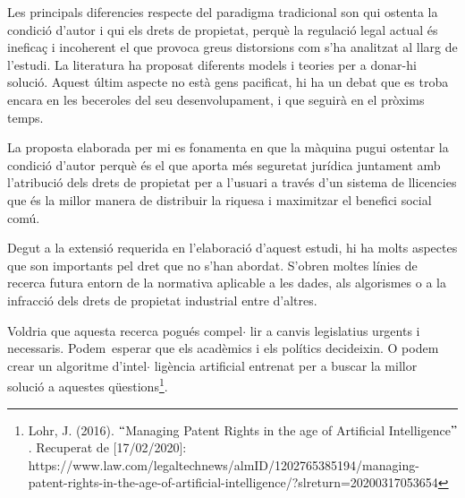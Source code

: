 \documentclass[12pt]{article}
\begin{document}
\vspace{\baselineskip}
\begin{justify}
Les principals diferencies respecte del paradigma tradicional son qui ostenta la condició d’autor i qui els drets de propietat,  perquè la regulació legal actual és ineficaç i incoherent el que provoca greus distorsions com s’ha analitzat al llarg de l’estudi. La literatura ha proposat diferents models i teories per a donar-hi solució. Aquest últim aspecte no està gens pacificat, hi ha un debat que es troba encara en les beceroles del seu desenvolupament, i que seguirà en el pròxims temps. 
\end{justify}\par


\vspace{\baselineskip}
\begin{justify}
La proposta elaborada per mi es fonamenta en que la màquina pugui ostentar la condició d’autor perquè és el que aporta més seguretat jurídica juntament amb l’atribució dels drets de propietat per a l’usuari a través d’un sistema de llicencies que és la millor manera de distribuir la riquesa i maximitzar el benefici social comú.
\end{justify}\par


\vspace{\baselineskip}
\begin{justify}
Degut a la extensió requerida en l’elaboració d’aquest estudi, hi ha molts aspectes que son importants pel dret que no s’han abordat. S’obren moltes línies de recerca futura entorn de la normativa aplicable a les dades, als algorismes o a la infracció dels drets de propietat industrial entre d’altres.
\end{justify}\par


\vspace{\baselineskip}
\begin{justify}
Voldria que aquesta recerca pogués compel$ \cdot $ lir a canvis legislatius urgents i necessaris. Podem\ esperar  que els acadèmics i els polítics decideixin. O podem crear un algoritme d’intel$ \cdot $ ligència artificial entrenat per a buscar la millor solució a aquestes qüestions\footnote{ Lohr, J. (2016). $``$Managing Patent Rights in the age of Artificial Intelligence$"$ . Recuperat de [17/02/2020]: https://www.law.com/legaltechnews/almID/1202765385194/managing-patent-rights-in-the-age-of-artificial-intelligence/?slreturn=20200317053654 }. 
\end{justify}\par
\end{document}
